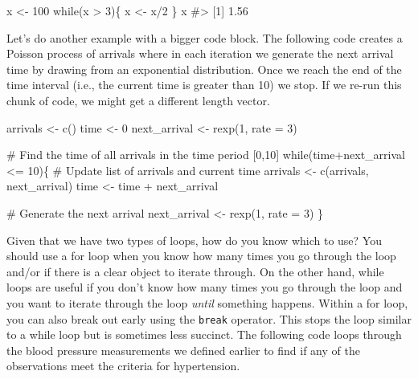 \documentclass[
  letterpaper,
]{latex/krantz}
\makeatletter
\newenvironment{Shaded}{\begin{snugshade}}{\end{snugshade}}
\newcommand{\AttributeTok}[1]{\textcolor[rgb]{0.40,0.45,0.13}{#1}}
\newcommand{\CommentTok}[1]{\textcolor[rgb]{0.37,0.37,0.37}{#1}}
\newcommand{\ControlFlowTok}[1]{\textcolor[rgb]{0.00,0.23,0.31}{#1}}
\newcommand{\DecValTok}[1]{\textcolor[rgb]{0.68,0.00,0.00}{#1}}
\newcommand{\FunctionTok}[1]{\textcolor[rgb]{0.28,0.35,0.67}{#1}}
\newcommand{\NormalTok}[1]{\textcolor[rgb]{0.00,0.23,0.31}{#1}}
\newcommand{\OtherTok}[1]{\textcolor[rgb]{0.00,0.23,0.31}{#1}}
\newcommand{\SpecialCharTok}[1]{\textcolor[rgb]{0.37,0.37,0.37}{#1}}
\newenvironment{kframe}{%
\medskip{}
\setlength{\fboxsep}{.8em}
 \def\at@end@of@kframe{}%
 \ifinner\ifhmode%
  \def\at@end@of@kframe{\end{minipage}}%
  \begin{minipage}{\columnwidth}%
 \fi\fi%
 \def\FrameCommand##1{\hskip\@totalleftmargin \hskip-\fboxsep
 \colorbox{shadecolor}{##1}\hskip-\fboxsep
     \hskip-\linewidth \hskip-\@totalleftmargin \hskip\columnwidth}%
 \MakeFramed {\advance\hsize-\width
   \@totalleftmargin\z@ \linewidth\hsize
   \@setminipage}}%
 {\par\unskip\endMakeFramed%
 \at@end@of@kframe}
\renewenvironment{Shaded}{\begin{kframe}}{\end{kframe}}
\makeatother
\begin{document}
\begin{Shaded}
\begin{Highlighting}[]
\NormalTok{x }\OtherTok{\textless{}{-}} \DecValTok{100}
\ControlFlowTok{while}\NormalTok{(x }\SpecialCharTok{\textgreater{}} \DecValTok{3}\NormalTok{)\{}
\NormalTok{  x }\OtherTok{\textless{}{-}}\NormalTok{ x}\SpecialCharTok{/}\DecValTok{2}
\NormalTok{\}}
\NormalTok{x}
\CommentTok{\#\textgreater{} [1] 1.56}
\end{Highlighting}
\end{Shaded}

Let's do another example with a bigger code block. The following code
creates a Poisson process of arrivals where in each iteration we
generate the next arrival time by drawing from an exponential
distribution. Once we reach the end of the time interval (i.e., the
current time is greater than 10) we stop. If we re-run this chunk of
code, we might get a different length vector.

\begin{Shaded}
\begin{Highlighting}[]
\NormalTok{arrivals }\OtherTok{\textless{}{-}} \FunctionTok{c}\NormalTok{()}
\NormalTok{time }\OtherTok{\textless{}{-}} \DecValTok{0}
\NormalTok{next\_arrival }\OtherTok{\textless{}{-}} \FunctionTok{rexp}\NormalTok{(}\DecValTok{1}\NormalTok{, }\AttributeTok{rate =} \DecValTok{3}\NormalTok{)}

\CommentTok{\# Find the time of all arrivals in the time period [0,10]}
\ControlFlowTok{while}\NormalTok{(time}\SpecialCharTok{+}\NormalTok{next\_arrival }\SpecialCharTok{\textless{}=} \DecValTok{10}\NormalTok{)\{}
  \CommentTok{\# Update list of arrivals and current time}
\NormalTok{  arrivals }\OtherTok{\textless{}{-}} \FunctionTok{c}\NormalTok{(arrivals, next\_arrival)}
\NormalTok{  time }\OtherTok{\textless{}{-}}\NormalTok{ time }\SpecialCharTok{+}\NormalTok{ next\_arrival}
  
  \CommentTok{\# Generate the next arrival}
\NormalTok{  next\_arrival }\OtherTok{\textless{}{-}} \FunctionTok{rexp}\NormalTok{(}\DecValTok{1}\NormalTok{, }\AttributeTok{rate =} \DecValTok{3}\NormalTok{)}
\NormalTok{\}}
\end{Highlighting}
\end{Shaded}

Given that we have two types of loops, how do you know which to use? You
should use a for loop when you know how many times you go through the
loop and/or if there is a clear object to iterate through. On the other
hand, while loops are useful if you don't know how many times you go
through the loop and you want to iterate through the loop \emph{until}
something happens. Within a for loop, you can also break out early using
the \texttt{break} operator. This stops the loop
similar to a while loop but is sometimes less succinct. The following
code loops through the blood pressure measurements we defined earlier to
find if any of the observations meet the criteria for hypertension.
\end{document}
